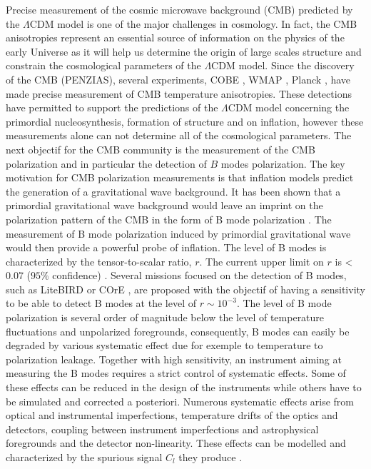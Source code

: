 Precise measurement of the cosmic microwave background (CMB) predicted by the $\Lambda$CDM model is one of the major challenges in cosmology. In fact, the CMB anisotropies represent an essential source of information on the physics of the early Universe as it will help us determine the origin of large scales structure and constrain the cosmological parameters of the $\Lambda$CDM model. Since the discovery of the CMB (PENZIAS), several experiments, COBE \citep{1992ApJ...396L...1S}, WMAP \citep{2013ApJS..208...20B}, Planck \citep{2016A&A...594A...1P}, have made precise measurement of CMB temperature anisotropies. These detections have permitted to support the predictions of the $\Lambda$CDM model concerning the primordial nucleosynthesis, formation of structure and on inflation, however these measurements alone can not determine all of the cosmological parameters. The next objectif for the CMB community is the measurement of the CMB polarization and in particular the detection of $B$ modes polarization. The key motivation for CMB polarization measurements is that  inflation models predict the generation of a gravitational wave background. It has been shown that a primordial gravitational wave background would leave an imprint on the polarization pattern of the CMB in the form of B mode polarization \citep{1997PhRvD..55.1830Z, 1997PhRvD..55.7368K}. The measurement of B mode polarization induced by primordial gravitational wave would then provide a powerful probe of inflation. The level of B modes is characterized by the tensor-to-scalar ratio, $r$. The current upper limit on $r$ is < 0.07 ($95 \%$ confidence) \citep{2016PhRvL.116c1302B}. Several missions focused on the detection of B modes, such as LiteBIRD \citep{2014JLTP..176..733M} or COrE \citep{2011arXiv1102.2181T}, are proposed with the objectif of having a sensitivity to be able to detect B modes at the level of $r \sim 10^{-3}$. The level of B mode polarization is several order of magnitude below the level of temperature fluctuations and unpolarized foregrounds, consequently, B modes can easily be degraded by various systematic effect due for exemple to temperature to polarization leakage. Together with high sensitivity, an instrument aiming at measuring the B modes requires a strict control of systematic effects.  
Some of these effects can be reduced in the design of the instruments while others have to be simulated and corrected a posteriori. Numerous systematic effects arise from optical and instrumental imperfections, temperature drifts of the optics and detectors, coupling between instrument imperfections and astrophysical foregrounds and the detector non-linearity. These effects can be modelled and characterized by the spurious signal $C_{l}$ they produce \citep{2008PhRvD..77h3003S,quickpol}. \\

